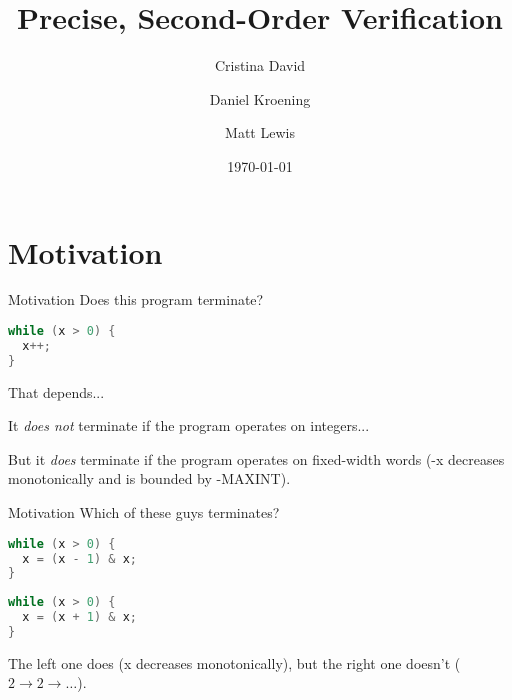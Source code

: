 \documentclass[xcolor=pdftex,t,11pt]{beamer}
\author{Cristina David \and Daniel Kroening \and Matt Lewis}
\title{Precise, Second-Order Verification}
\institute{Oxford University}
\date{\today}
\begin{document}

\begin{frame}[plain]
  \titlepage
\end{frame}

\iffalse
\begin{frame}{Outline}
  \tableofcontents
\end{frame}
\fi

\section{Motivation}


\begin{frame}[fragile]{Motivation}
Does this program terminate?
\begin{center}
\begin{minipage}{0.4\linewidth}
 \begin{lstlisting}[language=C,basicstyle=\normalsize]
while (x > 0) {
  x++;
}
 \end{lstlisting}
\end{minipage}
\end{center}

\pause

That depends...

It \emph{does not} terminate if the program operates on integers...

But it \emph{does} terminate if the program operates on fixed-width words
(-x decreases monotonically and is bounded by -MAXINT).

\end{frame}

\begin{frame}[fragile]{Motivation}
Which of these guys terminates?
\begin{center}
\begin{minipage}{0.45\linewidth}
 \begin{lstlisting}[language=C,basicstyle=\normalsize]
while (x > 0) {
  x = (x - 1) & x;
}
\end{lstlisting}
\end{minipage}
\begin{minipage}{0.45\linewidth}
 \begin{lstlisting}[language=C,basicstyle=\normalsize]
while (x > 0) {
  x = (x + 1) & x;
}
\end{lstlisting}
\end{minipage}
\end{center}

\pause

The left one does (x decreases monotonically), but the right one doesn't ($2 \rightarrow 2 \rightarrow \dots$).
\end{frame}
\end{document}
